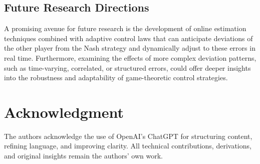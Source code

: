 \documentclass[letterpaper, 10 pt, conference]{ieeeconf}  %
\newtheorem{theorem}{\textbf{Theorem}} %
\begin{document}
\subsection*{Future Research Directions}
A promising avenue for future research is the development of online estimation techniques combined with adaptive control laws that can anticipate deviations of the other player from the Nash strategy and dynamically adjust to these errors in real time. Furthermore, examining the effects of more complex deviation patterns, such as time-varying, correlated, or structured errors, could offer deeper insights into the robustness and adaptability of game-theoretic control strategies. 

\section{Acknowledgment}
The authors acknowledge the use of OpenAI’s ChatGPT for structuring content, refining language, and improving clarity. All technical contributions, derivations, and original insights remain the authors' own work.


\end{document}
